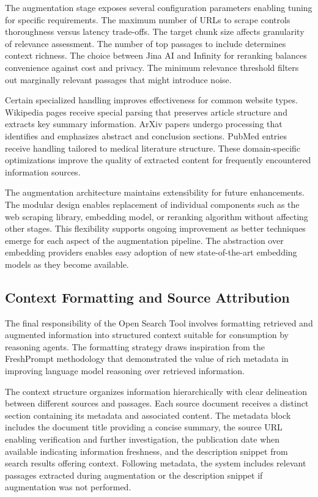 The augmentation stage exposes several configuration parameters enabling tuning for specific requirements. The maximum number of URLs to scrape controls thoroughness versus latency trade-offs. The target chunk size affects granularity of relevance assessment. The number of top passages to include determines context richness. The choice between Jina AI and Infinity for reranking balances convenience against cost and privacy. The minimum relevance threshold filters out marginally relevant passages that might introduce noise.

Certain specialized handling improves effectiveness for common website types. Wikipedia pages receive special parsing that preserves article structure and extracts key summary information. ArXiv papers undergo processing that identifies and emphasizes abstract and conclusion sections. PubMed entries receive handling tailored to medical literature structure. These domain-specific optimizations improve the quality of extracted content for frequently encountered information sources.

The augmentation architecture maintains extensibility for future enhancements. The modular design enables replacement of individual components such as the web scraping library, embedding model, or reranking algorithm without affecting other stages. This flexibility supports ongoing improvement as better techniques emerge for each aspect of the augmentation pipeline. The abstraction over embedding providers enables easy adoption of new state-of-the-art embedding models as they become available.

\subsection{Context Formatting and Source Attribution}

The final responsibility of the Open Search Tool involves formatting retrieved and augmented information into structured context suitable for consumption by reasoning agents. The formatting strategy draws inspiration from the FreshPrompt methodology that demonstrated the value of rich metadata in improving language model reasoning over retrieved information.

The context structure organizes information hierarchically with clear delineation between different sources and passages. Each source document receives a distinct section containing its metadata and associated content. The metadata block includes the document title providing a concise summary, the source URL enabling verification and further investigation, the publication date when available indicating information freshness, and the description snippet from search results offering context. Following metadata, the system includes relevant passages extracted during augmentation or the description snippet if augmentation was not performed.

